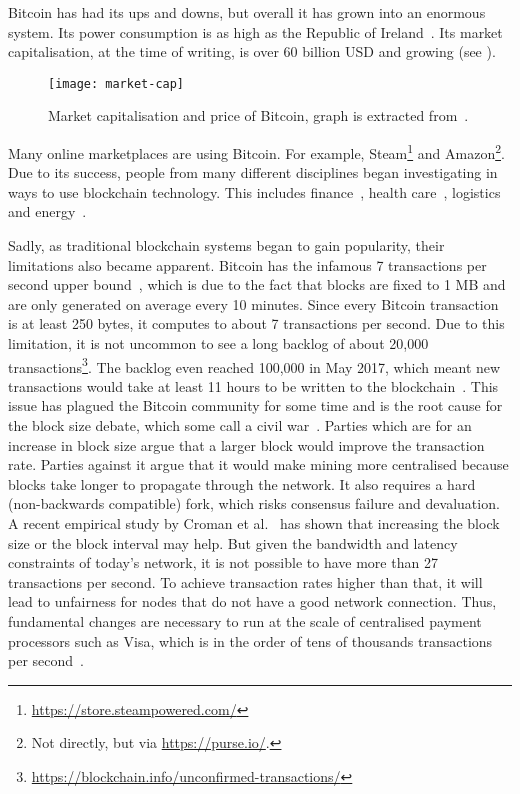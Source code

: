 Bitcoin has had its ups and downs, but overall it has grown into an enormous system.
Its power consumption is as high as the Republic of Ireland~\cite{o2014bitcoin}.
Its market capitalisation, at the time of writing, is over 60 billion USD and growing (see ).
\begin{figure}[h]
\centering
\texttt{[image: market-cap]}
\caption{Market capitalisation and price of Bitcoin, graph is extracted from~\cite{bitcoinmarketcap}.}
\label{fig:market-cap}
\end{figure}
Many online marketplaces are using Bitcoin.
For example, Steam\footnote{\url{https://store.steampowered.com/}} and Amazon\footnote{Not directly, but via \url{https://purse.io/}.}.
Due to its success, people from many different disciplines began investigating in ways to use blockchain technology.
This includes finance~\cite{finance}, health care~\cite{healthcare}, logistics~\cite{supplychain} and energy~\cite{energy}.

Sadly, as traditional blockchain systems began to gain popularity,
their limitations also became apparent.
Bitcoin has the infamous 7 transactions per second upper bound~\cite{vukolic2015quest}, 
which is due to the fact that blocks are fixed to 1 MB and are only generated on average every 10 minutes.
Since every Bitcoin transaction is at least 250 bytes, it computes to about 7 transactions per second.
Due to this limitation, it is not uncommon to see a long backlog of about 20,000 transactions\footnote{\url{https://blockchain.info/unconfirmed-transactions/}}.
The backlog even reached 100,000 in May 2017, which meant new transactions would take at least 11 hours to be written to the blockchain~\cite{bitcoinbacklog}.
This issue has plagued the Bitcoin community for some time and is the root cause for the block size debate, which some call a civil war~\cite{bitcoincivilwar}.
Parties which are for an increase in block size argue that a larger block would improve the transaction rate.
Parties against it argue that it would make mining more centralised because blocks take longer to propagate through the network.
It also requires a hard (non-backwards compatible) fork,
which risks consensus failure and devaluation.
A recent empirical study by Croman et al.~\cite{croman2016scaling} has shown that increasing the block size or the block interval may help.
But given the bandwidth and latency constraints of today's network,
it is not possible to have more than 27 transactions per second.
To achieve transaction rates higher than that, it will lead to unfairness for nodes that do not have a good network connection.
Thus, fundamental changes are necessary to run at the scale of centralised payment processors such as Visa,
which is in the order of tens of thousands transactions per second~\cite{visa}.

